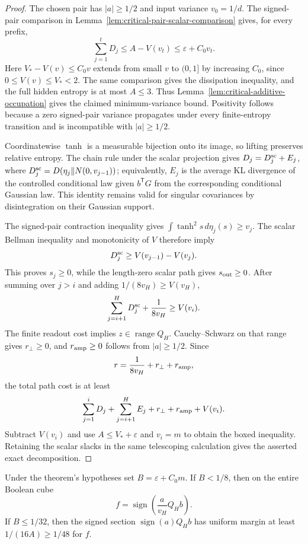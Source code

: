 \begin{proof}
The chosen pair has $|a|\ge1/2$ and input variance $v_0=1/d$.
The signed-pair comparison in
Lemma~\ref{lem:critical-pair-scalar-comparison} gives, for every
prefix,
\[
 \sum_{j=1}^tD_j\le A-V(v_t)
 \le\varepsilon+C_0v_t.
\]
Here $V_*-V(v)\le C_0v$ extends from small $v$ to $(0,1]$
by increasing $C_0$, since $0\le V(v)\le V_*<2$.
The same comparison gives the dissipation inequality, and the full
hidden entropy is at most $A\le3$. Thus
Lemma~\ref{lem:critical-additive-occupation} gives the claimed
minimum-variance bound. Positivity follows because a zero signed-pair
variance propagates under every finite-entropy transition and is
incompatible with $|a|\ge1/2$.

Coordinatewise $\tanh$ is a measurable bijection onto its image, so
lifting preserves relative entropy. The chain rule under the scalar
projection gives $D_j=D_j^{\rm sc}+E_j$, where
$D_j^{\rm sc}=D(\eta_j\Vert N(0,v_{j-1}))$; equivalently, $E_j$
is the average KL divergence of the controlled conditional law given
$b^{\mathsf T}G$ from the corresponding conditional Gaussian law.
This identity remains valid for singular covariances by disintegration
on their Gaussian support.

The signed-pair contraction inequality gives
$\int\tanh^2s\,d\eta_j(s)\ge v_j$. The scalar Bellman inequality
and monotonicity of $V$ therefore imply
\[
 D_j^{\rm sc}\ge V(v_{j-1})-V(v_j).
\]
This proves $s_j\ge0$, while the length-zero scalar path gives
$s_{\rm out}\ge0$.
After summing over $j>i$ and adding $1/(8v_H)\ge V(v_H)$,
\[
 \sum_{j=i+1}^H D_j^{\rm sc}+\frac1{8v_H}\ge V(v_i).
\]
The finite readout cost implies $z\in\operatorname{range}Q_H$.
Cauchy--Schwarz on that range gives $r_\perp\ge0$, and
$r_{\rm amp}\ge0$ follows from $|a|\ge1/2$. Since
\[
 r=\frac1{8v_H}+r_\perp+r_{\rm amp},
\]
the total path cost is at least
\[
 \sum_{j=1}^iD_j+\sum_{j=i+1}^H E_j
       +r_\perp+r_{\rm amp}+V(v_i).
\]
Subtract $V(v_i)$ and use $A\le V_*+\varepsilon$ and $v_i=m$
to obtain the boxed inequality. Retaining the scalar slacks in the
same telescoping calculation gives the asserted exact decomposition.
\end{proof}

\begin{corollary}
\label{cor:critical-anchored-section}
Under the theorem's hypotheses set $B=\varepsilon+C_0m$.
If $B<1/8$, then on the entire Boolean cube
\[
 f=\operatorname{sign}\!\left(\frac a{v_H}Q_Hb\right).
\]
If $B\le1/32$, then the signed section
$\operatorname{sign}(a)Q_Hb$ has uniform margin at least
$1/(16A)\ge1/48$ for $f$.
\end{corollary}

